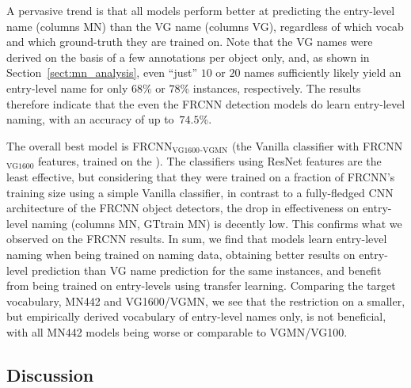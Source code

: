 
A pervasive trend is that all models perform better 
at predicting the entry-level name (columns MN) than the VG name (columns VG), regardless of which vocab and which ground-truth they are trained on.  
Note that the VG names were derived on the basis of a few annotations per object only, and, as shown in Section~\ref{sect:mn_analysis}, even ``just'' $10$ or $20$ names sufficiently likely yield an entry-level name for only $68\%$ or $78\%$ instances, respectively. 
The results therefore indicate that the even the FRCNN detection models do learn entry-level naming, with an accuracy of up to~$74.5$\%.

 The overall best model is FRCNN$_\text{VG1600}$$_\text{-VGMN}$ (the Vanilla classifier with FRCNN$_\text{VG1600}$ features, trained on the \mn). 
The classifiers using ResNet features are the least effective, but considering that they were trained on a fraction of FRCNN's training size using a simple Vanilla classifier, in contrast to a fully-fledged CNN architecture of the FRCNN object detectors, the drop in effectiveness on entry-level naming (columns MN, GTtrain MN) is decently low. This confirms what we observed on the FRCNN results. 
In sum, we find that models learn entry-level naming when being trained on \arbitrary naming data, obtaining better results on entry-level prediction than VG name prediction for the same instances, and benefit from being trained on entry-levels using transfer learning. Comparing the target vocabulary, MN442 and VG1600/VGMN, we see that the restriction on a smaller, but empirically derived vocabulary of entry-level names only, is not beneficial, with all MN442 models being worse or comparable to VGMN/VG100.


\subsection{Discussion}
\label{sect:exp_discussion}

